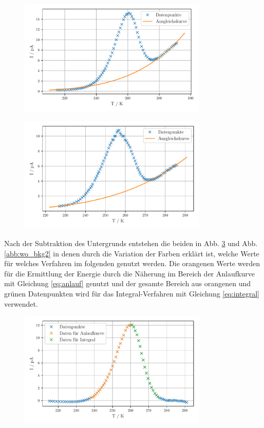\begin{figure}
    \centering
    \includegraphics[width=0.8\textwidth]{figures/data_w_bkg1.pdf}
    \caption{}
    \label{abb:strom1}
\end{figure}

\begin{figure}
    \centering
    \includegraphics[width=0.8\textwidth]{figures/data_w_bkg2.pdf}
    \caption{}
    \label{abb:strom2}
\end{figure}

Nach der Subtraktion des Untergrunds entstehen die beiden in Abb. \ref{abb:wo_bkg1} und Abb. \ref{abb:wo_bkg2} in denen durch die Variation der Farben erklärt ist, welche Werte für welches Verfahren im folgenden genutzt werden. Die orangenen Werte werden für die Ermittlung der Energie durch die Näherung im Bereich der Anlaufkurve mit Gleichung \eqref{eq:anlauf} genutzt und der gesamte Bereich aus orangenen und grünen Datenpunkten wird für das Integral-Verfahren mit Gleichung \eqref{eq:integral} verwendet. 

\begin{figure}
    \centering
    \includegraphics[width=0.8\textwidth]{figures/data_wo_bkg1.pdf}
    \caption{}
    \label{abb:wo_bkg1}
\end{figure}

